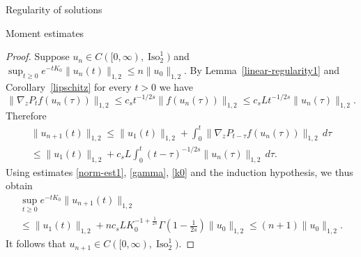 \documentclass[a4paper,10pt,fleqn]{amsart}
\theoremstyle{remark}
\theoremstyle{definition}
\DeclareMathOperator{\Iso}{Iso}
\newcommand{\grad} {\nabla_{\!z}}
\renewcommand{\=} {\overset{d}{=}}
\begin{document}
\begin{section}{Regularity of solutions}
\begin{subsection}{Moment estimates}
\begin{proof}
     Suppose $u_n\in C([0,\infty),\Iso^1_2)$ and
     $\sup_{t\geq0}e^{-tK_0}\|u_n(t)\|_{1,2}\leq n\|u_0\|_{1,2}$.
     By Lem\-ma~\ref{linear-regularity1} and Corollary~\ref{lipschitz} for every $t>0$ we have
     \begin{equation*}
      \|\grad P_{t} f(u_n(\tau))\|_{1,2} 
      \leq {c}_s t^{-1/2s}\|f(u_n(\tau))\|_{1,2} \leq {c}_sL t^{-1/2s}\|u_n(\tau)\|_{1,2}.
     \end{equation*}
     Therefore
     \begin{multline*}
      \|u_{n+1}(t)\|_{1,2} \leq \|u_1(t)\|_{1,2} + \int_0^{t} \|\grad P_{t-\tau} f(u_n(\tau))\|_{1,2}\,d\tau \\
      \leq \|u_1(t)\|_{1,2} + {c}_sL\int_0^{t} (t-\tau)^{-1/2s} \|u_n(\tau)\|_{1,2}\,d\tau.
     \end{multline*}
     Using estimates \eqref{norm-est1}, \eqref{gamma}, \eqref{k0} and the induction hypothesis, we thus obtain
     \begin{multline*}
      \sup_{t\geq0}e^{-tK_0}\|u_{n+1}(t)\|_{1,2}\\
      \leq \|u_1(t)\|_{1,2} + n{c}_sLK_0^{-1+\frac{1}{2s}}\Gamma(1-\tfrac{1}{2s})\|u_0\|_{1,2}\leq (n+1)\|u_0\|_{1,2}.
     \end{multline*}
     It follows that $u_{n+1}\in C([0,\infty),\Iso^1_2)$.


\end{proof}
\end{subsection}
\end{section}
\end{document}
